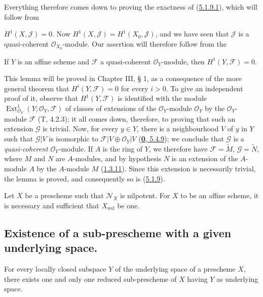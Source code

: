 Everything therefore comes down to proving the exactness of
(\hyperref[I.5.1.9.1]{5.1.9.1}), which will follow from

$H^1(X,\mathscr{J})=0$. Now
$H^1(X,\mathscr{J})=H^1(X_0,\mathscr{J})$, and we have seen that
$\mathscr{J}$ is a quasi-coherent $\mathscr{O}_{X_0}$-module. Our
assertion will therefore follow from the

\begin{lemma}[5.1.9.2]
\label{I.5.1.9.2}
If $Y$ is an affine scheme and $\mathscr{F}$ a quasi-coherent
$\mathscr{O}_Y$-module, then $H^1(Y,\mathscr{F})=0$.
\end{lemma}

This lemma will be proved in Chapter III, § 1, as a consequence of the more
general theorem that $H^i(Y,\mathscr{F})=0$ for every $i>0$. To give an
independent proof of it, observe that $H^1(Y,\mathscr{F})$ is identified with
the module $\operatorname{Ext}^1_{\mathscr{O}_Y}
(Y;\mathscr{O}_Y,\mathscr{F})$ of classes of extensions of the
$\mathscr{O}_Y$-module $\mathscr{O}_Y$ by the $\mathscr{O}_Y$-module
$\mathscr{F}$ (T, 4.2.3); it all comes down, therefore, to proving that such
an extension $\mathscr{G}$ is trivial. Now, for every $y\in Y$, there is a
neighbourhood $V$ of $y$ in $Y$ such that $\mathscr{G}|V$ is isomorphic to
$\mathscr{F}|V\oplus\mathscr{O}_Y|V$
(\hyperref[0.5.4.9]{\textbf{0}, 5.4.9}); we conclude that $\mathscr{G}$ is a
\emph{quasi-coherent} $\mathscr{O}_Y$-module. If $A$ is the ring of $Y$, we
therefore have $\mathscr{F}=\widetilde{M}$, $\mathscr{G}=\widetilde{N}$,
where $M$ and $N$ are $A$-modules, and by hypothesis $N$ is an extension of
the $A$-module $A$ by the $A$-module $M$ (\hyperref[I.1.3.11]{1.3.11}).
Since this extension is necessarily trivial, the lemma is proved, and
consequently so is (\hyperref[I.5.1.9]{5.1.9}).

\begin{corollary}[5.1.10]
\label{I.5.1.10}
Let $X$ be a prescheme such that $\mathscr{N}_X$ is nilpotent. For $X$
to be an affine scheme, it is necessary and sufficient that $X_{\mathrm{red}}$
be one.
\end{corollary}

\subsection{Existence of a sub-prescheme with a given underlying space.}
\label{subsection:I.5.2}

\begin{proposition}[5.2.1]
\label{I.5.2.1}
For every locally closed subspace $Y$ of the underlying space of a
prescheme $X$, there exists one and only one reduced sub-prescheme of $X$
having $Y$ as underlying space.
\end{proposition}

